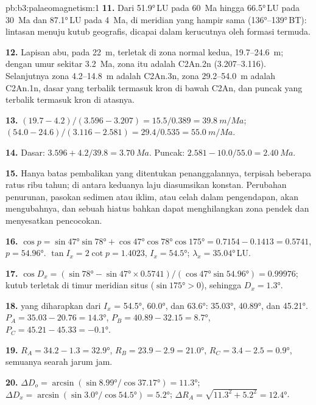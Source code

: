 \begin{solution}{pb:b3:palaeomagnetism:1}
\textbf{11.} Dari \ang{51.9}\,LU pada \qty{60}{Ma} hingga \ang{66.5}\,LU pada
\qty{30}{Ma} dan \ang{87.1}\,LU pada \qty{4}{Ma}, di meridian yang hampir sama
(\ang{136}--\ang{139}\,BT): lintasan menuju kutub geografis, dicapai dalam
kerucutnya oleh formasi termuda.

\textbf{12.} Lapisan abu, pada \qty{22}{m}, terletak di zona normal kedua,
19.7--\qty{24.6}{m}; dengan umur sekitar \qty{3.2}{Ma}, zona itu adalah C2An.2n
(3.207--3.116). Selanjutnya zona 4.2--\qty{14.8}{m} adalah C2An.3n, zona
29.2--\qty{54.0}{m} adalah C2An.1n, dasar yang terbalik termasuk kron di bawah
C2An, dan puncak yang terbalik termasuk kron di atasnya.

\textbf{13.} $(19.7 - 4.2)/(3.596 - 3.207) = 15.5/0.389 = \qty{39.8}{m/Ma}$;
$(54.0 - 24.6)/(3.116 - 2.581) = 29.4/0.535 = \qty{55.0}{m/Ma}$.

\textbf{14.} Dasar: $3.596 + 4.2/39.8 = \qty{3.70}{Ma}$. Puncak: $2.581 -
10.0/55.0 = \qty{2.40}{Ma}$.

\textbf{15.} Hanya batas pembalikan yang ditentukan penanggalannya, terpisah beberapa ratus
ribu tahun; di antara keduanya laju diasumsikan konstan. Perubahan penurunan,
pasokan sedimen atau iklim, atau celah dalam pengendapan, akan mengubahnya, dan sebuah
hiatus bahkan dapat menghilangkan zona pendek dan menyesatkan pencocokan.

\textbf{16.} $\cos p = \sin\ang{47}\sin\ang{78} + \cos\ang{47}\cos\ang{78}
\cos\ang{175} = 0.7154 - 0.1413 = 0.5741$, $p = \ang{54.96}$. $\tan I_x =
2\cot p = 1.4023$, $I_x = \ang{54.5}$; $\lambda_x = \ang{35.04}$\,LU.

\textbf{17.} $\cos D_x = (\sin\ang{78} - \sin\ang{47}\times0.5741)/
(\cos\ang{47}\sin\ang{54.96}) = 0.99976$; kutub terletak di timur
meridian situs ($\sin\ang{175} > 0$), sehingga $D_x = \ang{1.3}$.

\textbf{18.}  yang diharapkan dari $I_x$ = \ang{54.5}, \ang{60.0}, dan
\ang{63.6}: \ang{35.03}, \ang{40.89}, dan \ang{45.21}. $P_A = 35.03 - 20.76 =
\ang{14.3}$, $P_B = 40.89 - 32.15 = \ang{8.7}$, $P_C = 45.21 - 45.33 =
\ang{-0.1}$.

\textbf{19.} $R_A = 34.2 - 1.3 = \ang{32.9}$, $R_B = 23.9 - 2.9 = \ang{21.0}$,
$R_C = 3.4 - 2.5 = \ang{0.9}$, semuanya searah jarum jam.

\textbf{20.} $\Delta D_o = \arcsin(\sin\ang{8.99}/\cos\ang{37.17}) = \ang{11.3}$;
$\Delta D_x = \arcsin(\sin\ang{3.0}/\cos\ang{54.5}) = \ang{5.2}$; $\Delta R_A =
\sqrt{11.3^2 + 5.2^2} = \ang{12.4}$.


\end{solution}
